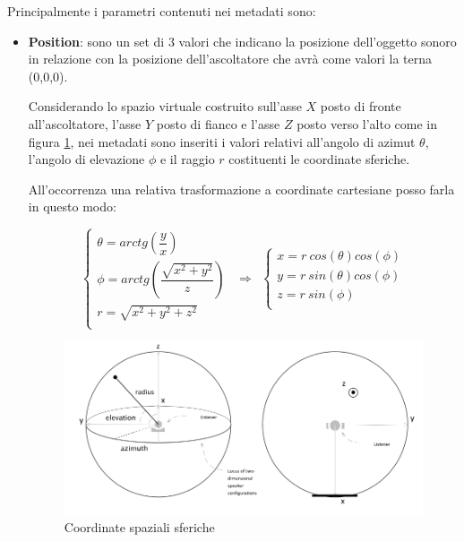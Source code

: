 \documentclass[12pt,a4paper]{report}
\begin{document}
Principalmente i parametri contenuti nei metadati sono:

\begin{itemize}\label{aaa}
\item \textbf{Position}: sono un set di 3 valori che indicano la posizione dell'oggetto sonoro in relazione con la posizione dell'ascoltatore che avrà come valori la terna (0,0,0).

Considerando lo spazio virtuale costruito sull'asse $X$ posto di fronte all'ascoltatore, l'asse $Y$ posto di fianco e l'asse $Z$ posto verso l'alto come in figura \ref{fig:coordinate}, nei metadati sono inseriti i valori relativi all'angolo di azimut $\theta$, l'angolo di elevazione $\phi$ e il raggio $r$ costituenti le coordinate sferiche.

All'occorrenza una relativa trasformazione a coordinate cartesiane posso farla in questo modo:

\begin{equation}
\left\{\begin{matrix}
\theta = arctg \left(\dfrac{y}{x} \right) \\
\phi   = arctg \left(\dfrac{\sqrt{x^2 + y^2 }}{z} \right) \\
r = \sqrt{x^2 +y^2 +z^2 }\\
\end{matrix}\right.	 \ \ \Rightarrow \ \  \left\{\begin{matrix}
x= r\ cos(\theta) cos(\phi) \\
y= r\ sin(\theta) cos(\phi)\\
z= r\ sin(\phi)\\
\end{matrix}\right.
	\label{eq:coordinatepolari}
\end{equation}

\begin{figure}[htbp]
	\centering
	\includegraphics[scale=0.40]{figures/azimut.png}
	\caption {Coordinate spaziali sferiche}
	\label{fig:coordinate}
	\end{figure}


\end{itemize}
\end{document}
